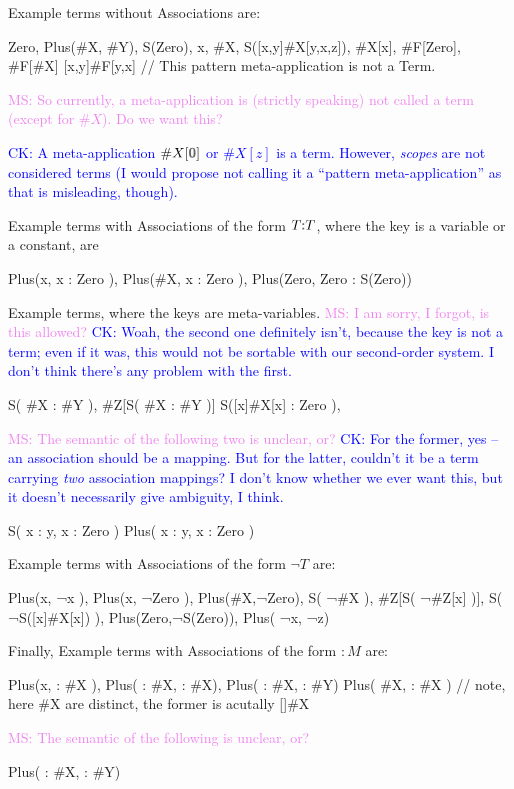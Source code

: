 \documentclass[letterpaper,11pt]{article}
\newcommand{\CK}[1]{\textcolor{blue}{CK: #1}}
\newcommand{\MS}[1]{\textcolor{violet}{MS: #1}}
\begin{document}
\begin{example}
  Example terms without Associations are: 
  \begin{hacs}[numbers=right, texcl]
      Zero, Plus(#X, #Y), S(Zero), x, #X, S([x,y]#X[y,x,z]), #X[x], #F[Zero], #F[#X]
      [x,y]#F[y,x]  // This pattern meta-application is not a Term. 
    \end{hacs}
    \MS{So currently, a meta-application is (strictly speaking) not called a term (except for
      $\#X$). Do we want this?}

    \CK{A meta-application $\#X[\kw{0}]$ or $\#X[z]$ is a term.  However,
    \emph{scopes} are not considered terms (I would propose not calling it
    a ``pattern meta-application'' as that is misleading, though).}
    
    Example terms with Associations of the form $T \kw{:} T$, where the key is a variable or a
    constant, are
    \begin{hacs}[numbers=right,texcl]
      Plus(x, { x : Zero }), Plus(#X, { x : Zero }), Plus(Zero, {Zero : S(Zero)}) 
    \end{hacs}
    
    Example terms, where the keys are meta-variables. \MS{I am sorry, I forgot, is this allowed?}
    \CK{Woah, the second one definitely isn't, because the key is not a term;
    even if it was, this would not be sortable with our second-order system.
    I don't think there's any problem with the first.}
    \begin{hacs}[numbers=right,texcl]
     S({ #X : #Y }), #Z[S({ #X : #Y })]                    
     S({[x]#X[x] : Zero }), 
   \end{hacs}

   \MS{The semantic of the following two is unclear, or?}
   \CK{For the former, yes -- an association should be a mapping.  But for the
   latter, couldn't it be a term carrying \emph{two} association mappings?  I
   don't know whether we ever want this, but it doesn't necessarily give
   ambiguity, I think.}
   \begin{hacs}[numbers=right,texcl]  
     S( {x : y, x : Zero} )
     Plus( {x : y}, {x : Zero} )
   \end{hacs}
   Example terms with Associations of the form $¬T$ are:
   \begin{hacs}[numbers=right,texcl]
     Plus(x, { ¬x }), Plus(x, { ¬Zero }), Plus(#X,{¬Zero}), S({ ¬#X }), 
     #Z[S({ ¬#Z[x] })], S({ ¬S([x]#X[x]) }), Plus(Zero,{¬S(Zero)}), Plus({ ¬x}, { ¬z})
   \end{hacs}
   
   Finally, Example terms with Associations of the form $: M$ are:
   \begin{hacs}[numbers=right,texcl]
     Plus(x, { : #X }), Plus( { : #X}, { : #X}), Plus( { : #X}, { : #Y})
     Plus( #X, { : #X })  // note, here \#X are distinct, the former is acutally []\#X
   \end{hacs}
   
   \MS{The semantic of the following is unclear, or?}
   \begin{hacs}[numbers=right,texcl]
    Plus( { : #X, : #Y})
  \end{hacs}
\end{example}  
\end{document}
